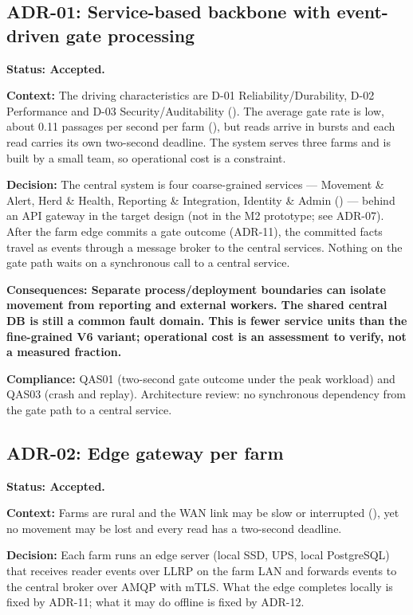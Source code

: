 \subsection{ADR-01: Service-based backbone with event-driven gate processing}\label{adr:01}

\textbf{Status: Accepted.}

\textbf{Context:} The driving characteristics are D-01
Reliability/Durability, D-02 Performance and D-03 Security/Auditability
(). The average gate rate is low, about 0.11 passages per
second per farm (), but reads arrive in bursts and each
read carries its own two-second deadline. The system serves three farms
and is built by a small team, so operational cost is a constraint.

\textbf{Decision:} The central system is four coarse-grained services
--- Movement \& Alert, Herd \& Health, Reporting \& Integration,
Identity \& Admin () --- behind an API gateway in the target design (not in the M2 prototype; see ADR-07). After the farm edge commits a gate outcome (ADR-11),
the committed facts travel as events through a message broker to the
central services. Nothing on the gate path
waits on a synchronous call to a central service.

\textbf{Consequences: Separate process/deployment boundaries can isolate
movement from reporting and external workers. The shared central DB is
still a common fault domain. This is fewer service units than the
fine-grained V6 variant; operational cost is an assessment to verify,
not a measured fraction.}

\textbf{Compliance:} QAS01 (two-second gate outcome under the peak
workload) and QAS03 (crash and replay). Architecture review: no
synchronous dependency from the gate path to a central service.

\subsection{ADR-02: Edge gateway per farm}\label{adr:02}

\textbf{Status: Accepted.}

\textbf{Context:} Farms are rural and the WAN link may be slow or
interrupted (), yet no movement may be lost and every read
has a two-second deadline.

\textbf{Decision:} Each farm runs an edge server (local SSD, UPS, local
PostgreSQL) that receives reader events over LLRP on the farm LAN and
forwards events to the central broker over AMQP with mTLS. What the edge
completes locally is fixed by ADR-11; what it may do offline is fixed by
ADR-12.

